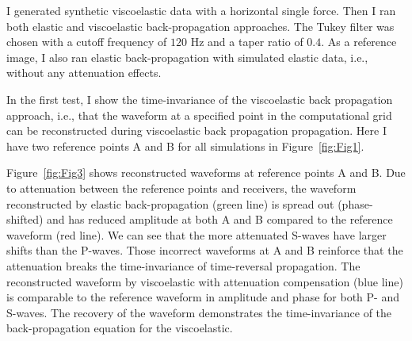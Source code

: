 
I generated synthetic viscoelastic data with a horizontal single force. Then I ran both elastic and viscoelastic back-propagation approaches. The Tukey filter was chosen with a cutoff frequency of $120$ Hz and a taper ratio of $0.4$. As a reference image, I also ran elastic back-propagation with simulated elastic data, i.e., without any attenuation effects. 
 
In the first test, I show the time-invariance of the viscoelastic back propagation approach, i.e., that the waveform at a specified point in the computational grid can be reconstructed during viscoelastic back propagation propagation. Here I have two reference points A and B for all simulations in Figure~\ref{fig:Fig1}. 

Figure~\ref{fig:Fig3} shows reconstructed waveforms at reference points A and B. Due to attenuation between the reference points and receivers, the waveform reconstructed by elastic back-propagation (green line) is spread out (phase-shifted) and has reduced amplitude at both A and B compared to the reference waveform (red line). We can see that the more attenuated S-waves have larger shifts than the P-waves. Those incorrect waveforms at A and B reinforce that the attenuation breaks the time-invariance of time-reversal propagation. The reconstructed waveform by viscoelastic with attenuation compensation (blue line) is comparable to the reference waveform in amplitude and phase for both P- and S-waves. The recovery of the waveform demonstrates the time-invariance of the back-propagation equation for the viscoelastic. 

